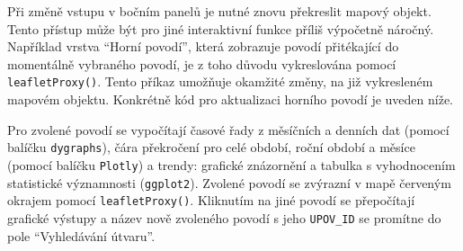 \documentclass[12pt,]{article}
\newenvironment{Shaded}{\begin{snugshade}}{\end{snugshade}}
\newcommand{\KeywordTok}[1]{\textcolor[rgb]{0.13,0.29,0.53}{\textbf{#1}}}
\newcommand{\DataTypeTok}[1]{\textcolor[rgb]{0.13,0.29,0.53}{#1}}
\newcommand{\FloatTok}[1]{\textcolor[rgb]{0.00,0.00,0.81}{#1}}
\newcommand{\StringTok}[1]{\textcolor[rgb]{0.31,0.60,0.02}{#1}}
\newcommand{\OtherTok}[1]{\textcolor[rgb]{0.56,0.35,0.01}{#1}}
\newcommand{\OperatorTok}[1]{\textcolor[rgb]{0.81,0.36,0.00}{\textbf{#1}}}
\newcommand{\NormalTok}[1]{#1}
\begin{document}
\begin{Shaded}
\end{Shaded}

\qquad Při změně vstupu v bočním panelů je nutné znovu překreslit mapový
objekt. Tento přístup může být pro jiné interaktivní funkce příliš
výpočetně náročný. Například vrstva \enquote{Horní povodí}, která
zobrazuje povodí přitékající do momentálně vybraného povodí, je z toho
důvodu vykreslována pomocí \texttt{leafletProxy()}. Tento příkaz
umožňuje okamžité změny, na již vykresleném mapovém objektu. Konkrétně
kód pro aktualizaci horního povodí je uveden níže.

\begin{Shaded}
\end{Shaded}

\qquad Pro zvolené povodí se vypočítají časové řady z měsíčních a
denních dat (pomocí balíčku \texttt{dygraphs}), čára překročení pro celé
období, roční období a měsíce (pomocí balíčku \texttt{Plotly}) a trendy:
grafické znázornění a tabulka s vyhodnocením statistické významnosti
(\texttt{ggplot2}). Zvolené povodí se zvýrazní v mapě červeným okrajem
pomocí \texttt{leafletProxy()}. Kliknutím na jiné povodí se přepočítají
grafické výstupy a název nově zvoleného povodí s jeho \texttt{UPOV\_ID}
se promítne do pole \enquote{Vyhledávání útvaru}.
\end{document}
